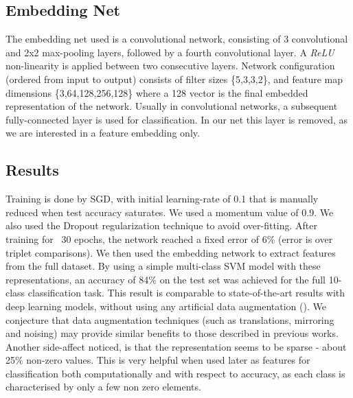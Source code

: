\documentclass{article} %
\begin{document}
\subsection{Embedding Net}
The embedding net used is a convolutional network, consisting of 3 convolutional and 2x2 max-pooling layers, followed by a fourth convolutional layer. A \emph{ReLU} non-linearity is applied between two consecutive layers.
Network configuration (ordered from input to output) consists of filter sizes \{5,3,3,2\}, and feature map dimensions \{3,64,128,256,128\} where a 128 vector is the final embedded representation of the network. Usually in convolutional networks, a subsequent fully-connected
layer is used for classification. In our net this layer is removed, as we are interested in a feature embedding only.


\subsection{Results}
Training is done by SGD, with initial learning-rate of 0.1 that is manually reduced when test accuracy saturates. We used a momentum value of 0.9. We also used the Dropout regularization technique to avoid over-fitting.
After training for ~30 epochs, the network reached a fixed error of 6\% (error is over triplet comparisons). We then used the embedding network to extract features from the full dataset. By using a simple multi-class SVM model with these representations, an accuracy of 84\% on the test set was achieved for the full 10-class classification task.
This result is comparable to state-of-the-art results with deep learning models, without using any artificial data augmentation (\citet{zeiler2013stochastic,goodfellow2013maxout,LinCY13}). We conjecture that data augmentation techniques (such as translations, mirroring and noising) may provide similar benefits to those described in previous works.\\
Another side-affect noticed, is that the representation seems to be sparse - about 25\% non-zero values. This is very helpful when used later as features for classification both computationally and with respect to accuracy, as each class is characterised by only a few non zero elements.
\end{document}
